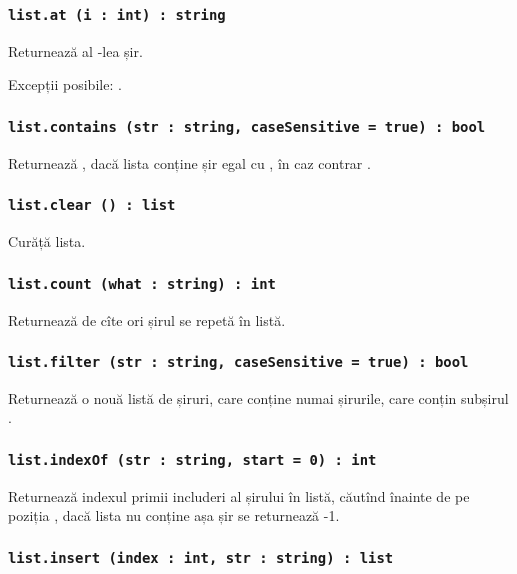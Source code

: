 \subsubsection{\lstinline|list.at (i : int) : string|}

Returnează al -lea șir.

Excepții posibile: .

\subsubsection{\lstinline|list.contains (str : string, caseSensitive = true) : bool|}

Returnează \true, dacă lista conține șir egal cu , în caz contrar \false.

\subsubsection{\lstinline|list.clear () : list|}

Curăță lista.

\subsubsection{\lstinline|list.count (what : string) : int|}

Returnează de cîte ori șirul  se repetă în listă.

\subsubsection{\lstinline|list.filter (str : string, caseSensitive = true) : bool|}

Returnează o nouă listă de șiruri, care conține numai șirurile, care conțin subșirul . 

\subsubsection{\lstinline|list.indexOf (str : string, start = 0) : int|}

Returnează indexul primii includeri al șirului  în listă, căutînd înainte de pe poziția , dacă lista nu conține așa șir se returnează -1.

\subsubsection{\lstinline|list.insert (index : int, str : string) : list|}

